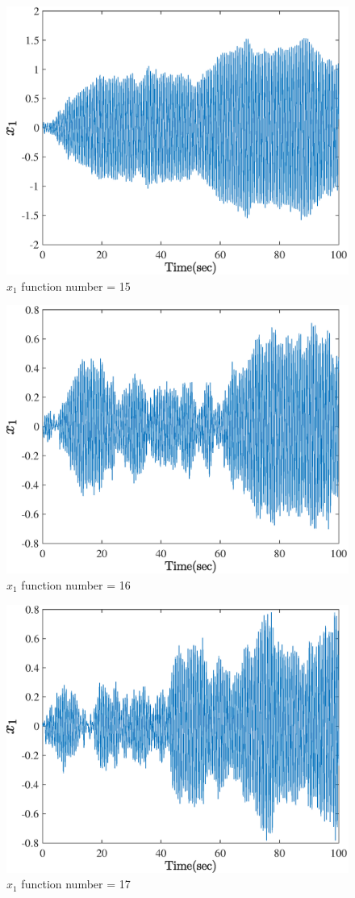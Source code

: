   \begin{figure}[H] 
  	\caption{$x_1$ function number = 15} 
  	\centering 
  	\includegraphics[width=12cm]{../Figure/Q5/part_a/15} 
  \end{figure}
  \begin{figure}[H] 
  	\caption{$x_1$ function number = 16} 
  	\centering 
  	\includegraphics[width=12cm]{../Figure/Q5/part_a/16} 
  \end{figure}
  \begin{figure}[H] 
  	\caption{$x_1$ function number = 17} 
  	\centering 
  	\includegraphics[width=12cm]{../Figure/Q5/part_a/17} 
  \end{figure}

